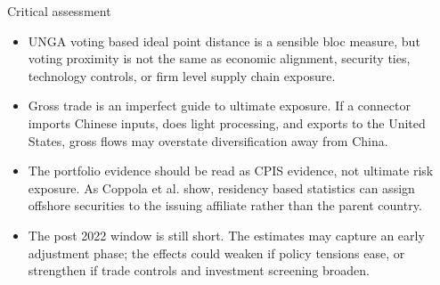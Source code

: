 \documentclass[11pt]{beamer}
\newcommand{\slideclaim}[1]{\vspace{-0.1cm}{#1}}
\begin{document}
\begin{frame}{Critical assessment}
  \begin{itemize}
    \item UNGA voting based ideal point distance is a sensible bloc measure, but voting proximity is not the same as economic alignment, security ties, technology controls, or firm level supply chain exposure.
    \item Gross trade is an imperfect guide to ultimate exposure. If a connector imports Chinese inputs, does light processing, and exports to the United States, gross flows may overstate diversification away from China.
    \item The portfolio evidence should be read as CPIS evidence, not ultimate risk exposure. As Coppola et al. show, residency based statistics can assign offshore securities to the issuing affiliate rather than the parent country.
    \item The post 2022 window is still short. The estimates may capture an early adjustment phase; the effects could weaken if policy tensions ease, or strengthen if trade controls and investment screening broaden.
  \end{itemize}
\end{frame}

\end{document}

